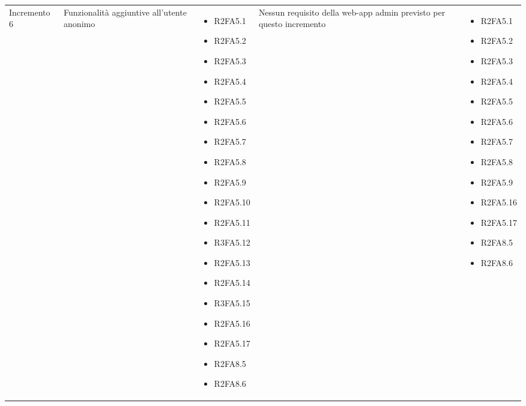 {\begin{longtable}{C{2.5cm} C{3.2cm} C{2.8cm} C{2.8cm} C{2.8cm}}
Incremento 6 & Funzionalità aggiuntive all'utente anonimo & \begin{itemize}
    \item[ ] R2FA5.1
    \item[ ] R2FA5.2
    \item[ ] R2FA5.3
    \item[ ] R2FA5.4
    \item[ ] R2FA5.5
    \item[ ] R2FA5.6
    \item[ ] R2FA5.7
    \item[ ] R2FA5.8
    \item[ ] R2FA5.9
    \item[ ] R2FA5.10
    \item[ ] R2FA5.11
    \item[ ] R3FA5.12
    \item[ ] R2FA5.13
    \item[ ] R2FA5.14
    \item[ ] R3FA5.15
    \item[ ] R2FA5.16
    \item[ ] R2FA5.17
    \item[ ] R2FA8.5
    \item[ ] R2FA8.6
\end{itemize} &
    Nessun requisito della web-app admin previsto per questo incremento
    & \begin{itemize} 
    \item[ ] R2FA5.1
    \item[ ] R2FA5.2
    \item[ ] R2FA5.3
    \item[ ] R2FA5.4
    \item[ ] R2FA5.5
    \item[ ] R2FA5.6
    \item[ ] R2FA5.7
    \item[ ] R2FA5.8
    \item[ ] R2FA5.9
    \item[ ] R2FA5.16
    \item[ ] R2FA5.17
    \item[ ] R2FA8.5
    \item[ ] R2FA8.6
\end{itemize}\\


\end{longtable}}
